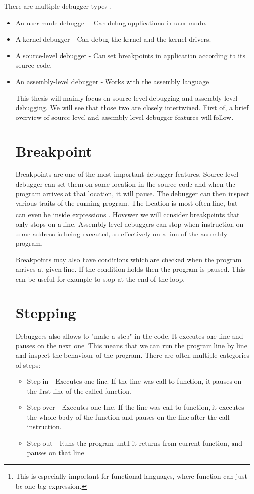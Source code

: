 There are multiple debugger types .
\begin{itemize}
    \item An user-mode debugger - Can debug applications in user mode.
    \item A kernel debugger - Can debug the kernel and the kernel drivers.
    \item A source-level debugger - Can set breakpoints in application according to its source code.
    \item An assembly-level debugger - Works with the assembly language

This thesis will mainly focus on source-level debugging and assembly level debugging. We will see that those two are closely intertwined. First of, a brief overview of source-level and assembly-level debugger features will follow.

\section{Breakpoint}\label{breakpoint}
Breakpoints are one of the most important debugger features. Source-level debugger can set them on some location in the source code and when the program arrives at that location, it will pause. The debugger can then inspect various traits of the running program. The location is most often line, but can even be inside expressions\footnote{This is especially important for functional languages, where function can just be one big expression.}. Hovewer we will consider breakpoints that only stops on a line. Assembly-level debuggers can stop when instruction on some address is being executed, so effectively on a line of the assembly program.

Breakpoints may also have conditions which are checked when the program arrives at given line. If the condition holds then the program is paused. This can be useful for example to stop at the end of the loop.

\section{Stepping}
Debuggers also allows to "make a step" in the code. It executes one line and pauses on the next one. This means that we can run the program line by line and inspect the behaviour of the program.
There are often multiple categories of steps:

\begin{itemize}
    \item Step in - Executes one line. If the line was call to function, it pauses on the first line of the called function.
    \item Step over - Executes one line. If the line was call to function, it executes the whole body of the function and pauses on the line after the call instruction.
    \item Step out - Runs the program until it returns from current function, and pauses on that line.
\end{itemize}


\end{itemize}
